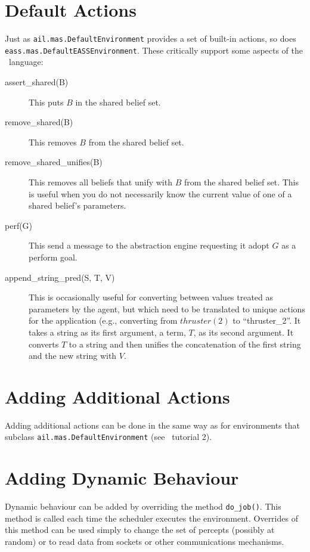 \section{Default Actions}
Just as \texttt{ail.mas.DefaultEnvironment} provides a set of built-in actions, so does \texttt{eass.mas.DefaultEASSEnvironment}.  These critically support some aspects of the \eass\ language:

\begin{description}
\item[assert\_shared(B)] This puts $B$ in the shared belief set.
\item[remove\_shared(B)] This removes $B$ from the shared belief set.
\item[remove\_shared\_unifies(B)] This removes all beliefs that unify with $B$ from the shared belief set.  This is useful when you do not necessarily know the current value of one of a shared belief's parameters.
\item[perf(G)] This send a message to the abstraction engine requesting it adopt $G$ as a perform goal.
\item[append\_string\_pred(S, T, V)] This is occasionally useful for converting between values treated as parameters by the agent, but which need to be translated to unique actions for the application (e.g., converting from $thruster(2)$ to ``thruster\_2''.  It takes a string as its first argument, a term, $T$, as its second argument.  It converts $T$ to a string and then unifies the concatenation of the first string and the new string with $V$.
\end{description}

\section{Adding Additional Actions}
Adding additional actions can be done in the same way as for environments that subclass \texttt{ail.mas.DefaultEnvironment} (see \ail\ tutorial 2).

\section{Adding Dynamic Behaviour}

Dynamic behaviour can be added by overriding the method \texttt{do\_job()}.  This method is called each time the scheduler executes the environment.  Overrides of this method can be used simply to change the set of percepts (possibly at random) or to read data from sockets or other communications mechanisms.

